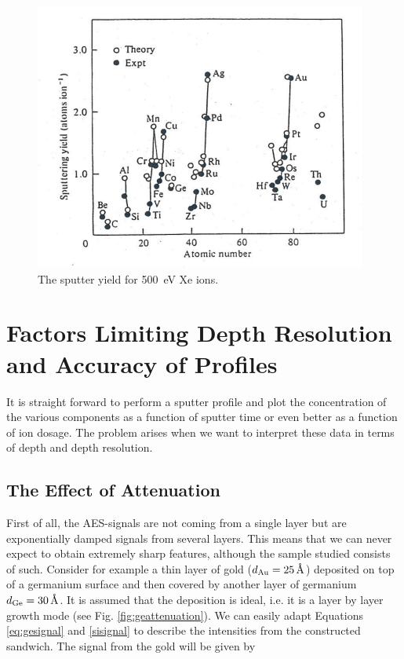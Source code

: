 \begin{figure}[h!]
	\begin{center}
	\includegraphics[scale=4]{figures/07_04.png}
	\caption{The sputter yield for \SI{500}{\electronvolt} Xe ions.}
	\label{fig:xesputteryield}
	\end{center}
\end{figure}

\section{Factors Limiting Depth Resolution and Accuracy of Profiles}
It is straight forward to perform a sputter profile and plot the concentration of the various components as a function of sputter time or even better as a function of ion dosage. The problem arises when we want to interpret these data in terms of depth and depth resolution.

\subsection{The Effect of Attenuation}
First of all, the AES-signals are not coming from a single layer but are exponentially damped signals from several layers. This means that we can never expect to obtain extremely sharp features, although the sample studied consists of such. Consider for example a thin layer of gold ($d_{\ce{Au}}=\SI{25}{\angstrom}$) deposited on top of a germanium surface and then covered by another layer of germanium $d_{\ce{Ge}}=\SI{30}{\angstrom}$. It is assumed that the deposition is ideal, i.e. it is a layer by layer growth mode (see Fig. \ref{fig:geattenuation}). We can easily adapt Equations \eqref{eq:gesignal} and \eqref{sisignal} to describe the intensities from the constructed sandwich. The signal from the gold will be given by

